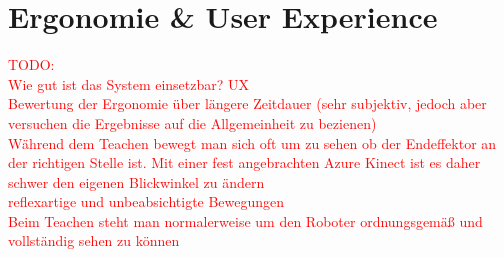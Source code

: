 \section{Ergonomie \& User Experience}

\textcolor{red}{TODO:\\
Wie gut ist das System einsetzbar? UX\\
Bewertung der Ergonomie über längere Zeitdauer (sehr subjektiv, jedoch aber versuchen die Ergebnisse auf die Allgemeinheit zu bezienen)\\
Während dem Teachen bewegt man sich oft um zu sehen ob der Endeffektor an der richtigen Stelle ist. Mit einer fest angebrachten Azure Kinect ist es daher schwer den eigenen Blickwinkel zu ändern\\
reflexartige und unbeabsichtigte Bewegungen\\
Beim Teachen steht man normalerweise um den Roboter ordnungsgemäß und vollständig sehen zu können
}

